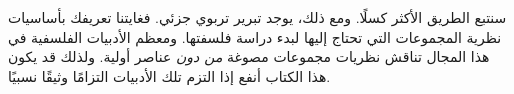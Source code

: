 \documentclass[../../../include/open-logic-section]{subfiles}
\begin{document}
سنتبع الطريق الأكثر كسلًا. ومع ذلك، يوجد تبرير تربوي جزئي. فغايتنا
تعريفك بأساسيات نظرية المجموعات التي تحتاج إليها لبدء دراسة فلسفتها.
ومعظم الأدبيات الفلسفية في هذا المجال تناقش نظريات مجموعات مصوغة
\emph{من دون} عناصر أولية. ولذلك قد يكون هذا الكتاب أنفع إذا التزم
تلك الأدبيات التزامًا وثيقًا نسبيًا.
\end{document}
